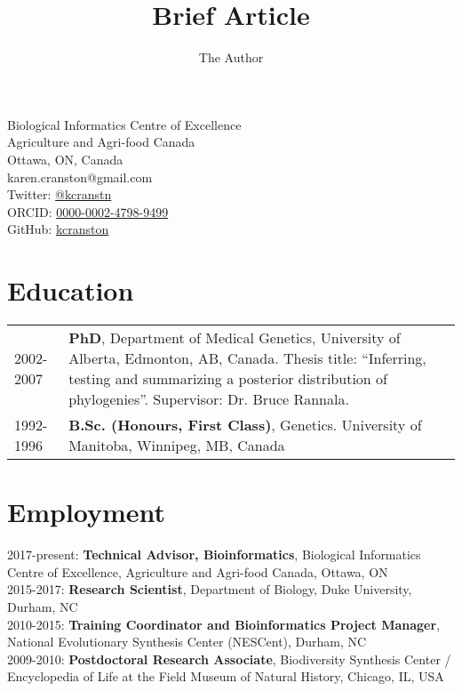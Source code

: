 \documentclass[10pt]{article}
\title{Brief Article}
\author{The Author}
\begin{document}
Biological Informatics Centre of Excellence  \\
Agriculture and Agri-food Canada \\
Ottawa, ON, Canada \\
karen.cranston@gmail.com \\
Twitter: \href{https://twitter.com/kcranstn}{@kcranstn} \\
ORCID: \href{http://orcid.org/0000-0002-4798-9499}{0000-0002-4798-9499} \\
GitHub: \href{https://github.com/kcranston}{kcranston}

\section*{Education}
\begin{table}[h]
	\begin{tabular}{ p{2.0cm} p{12.4cm} }
		2002-2007 & {\bf PhD}, Department of Medical Genetics, University of Alberta, Edmonton, AB, Canada. Thesis title: ``Inferring, testing and summarizing a posterior distribution of phylogenies''. Supervisor: Dr. Bruce Rannala. \\
		1992-1996 & {\bf B.Sc. (Honours, First Class)}, Genetics. University of Manitoba, Winnipeg, MB, Canada \\
	\end{tabular}
\end{table}

\section*{Employment}

2017-present:  \textbf{Technical Advisor, Bioinformatics}, Biological Informatics Centre of Excellence, Agriculture and Agri-food Canada, Ottawa, ON \\

2015-2017: \textbf{Research Scientist}, Department of Biology, Duke University, Durham, NC \\

2010-2015: \textbf{Training Coordinator and Bioinformatics Project Manager}, National Evolutionary Synthesis Center (NESCent), Durham, NC \\

2009-2010: \textbf{Postdoctoral Research Associate}, Biodiversity Synthesis Center / Encyclopedia of Life at the Field Museum of Natural History, Chicago, IL, USA  \\
\end{document}
